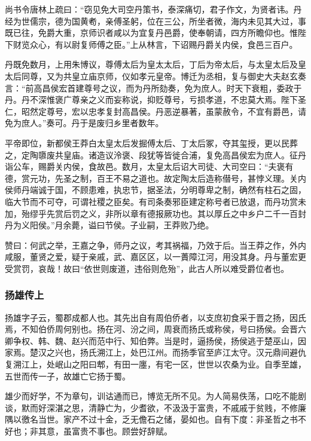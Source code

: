 \documentclass[]{article}
\begin{document}
尚书令唐林上疏曰：``窃见免大司空丹策书，泰深痛切，君子作文，为贤者讳。丹经为世儒宗，德为国黄耇，亲傅圣躬，位在三公，所坐者微，海内未见其大过，事既已往，免爵大重，京师识者咸以为宜复丹邑爵，使奉朝请，四方所瞻仰也。惟陛下财览众心，有以尉复师傅之臣。''上从林言，下诏赐丹爵关内侯，食邑三百户。

丹既免数月，上用朱博议，尊傅太后为皇太太后，丁后为帝太后，与太皇太后及皇太后同尊，又为共皇立庙京师，仪如孝元皇帝。博迁为丞相，复与御史大夫赵玄奏言：``前高昌侯宏首建尊号之议，而为丹所劾奏，免为庶人。时天下衰粗，委政于丹。丹不深惟褒广尊亲之义而妄称说，抑贬尊号，亏损孝道，不忠莫大焉。陛下圣仁，昭然定尊号，宏以忠孝复封高昌侯。丹恶逆暴著，虽蒙赦令，不宜有爵邑，请免为庶人。''奏可。丹于是废归乡里者数年。

平帝即位，新都侯王莽白太皇太后发掘傅太后、丁太后冢，夺其玺授，更以民葬之，定陶隳废共皇庙。诸造议泠褒、段犹等皆徙合浦，复免高昌侯宏为庶人。征丹诣公车，赐爵关内侯，食故邑。数月，太皇太后诏大司徒、大司空曰：``夫褒有德，赏元功，先圣之制，百王不易之道也。故定陶太后造称僣号，甚悖义理。关内侯师丹端诚于国，不顾患难，执忠节，据圣法，分明尊卑之制，确然有柱石之固，临大节而不可夺，可谓社稷之臣矣。有司条奏邪臣建定称号者已放退，而丹功赏未加，殆缪乎先赏后罚之义，非所以章有德报厥功也。其以厚丘之中乡户二千一百封丹为义阳侯。''月余薨，谥曰节侯。子业嗣，王莽败乃绝。

赞曰：何武之举，王嘉之争，师丹之议，考其祸福，乃效于后。当王莽之作，外内咸服，董贤之爱，疑于亲戚，武、嘉区区，以一蕢障江河，用没其身。丹与董宏更受赏罚，哀哉！故曰``依世则废道，违俗则危殆''，此古人所以难受爵位者也。

\hypertarget{header-n5857}{%
\subsubsection{扬雄传上}\label{header-n5857}}

扬雄字子云，蜀郡成都人也。其先出自有周伯侨者，以支庶初食采于晋之扬，因氏焉，不知伯侨周何别也。扬在河、汾之间，周衰而扬氏或称侯，号曰扬侯。会晋六卿争权、韩、魏、赵兴而范中行、知伯弊。当是时，逼扬侯，扬侯逃于楚巫山，因家焉。楚汉之兴也，扬氏溯江上，处巴江州。而扬季官至庐江太守。汉元鼎间避仇复溯江上，处岷山之阳曰郫，有田一廛，有宅一区，世世以农桑为业。自季至雄，五世而传一子，故雄亡它扬于蜀。

雄少而好学，不为章句，训诂通而已，博览无所不见。为人简易佚荡，口吃不能剧谈，默而好深湛之思，清静亡为，少耆欲，不汲汲于富贵，不戚戚于贫贱，不修廉隅以徼名当世。家产不过十金，乏无儋石之储，晏如也。自有下度：非圣哲之书不好也；非其意，虽富贵不事也。顾尝好辞赋。
\end{document}
